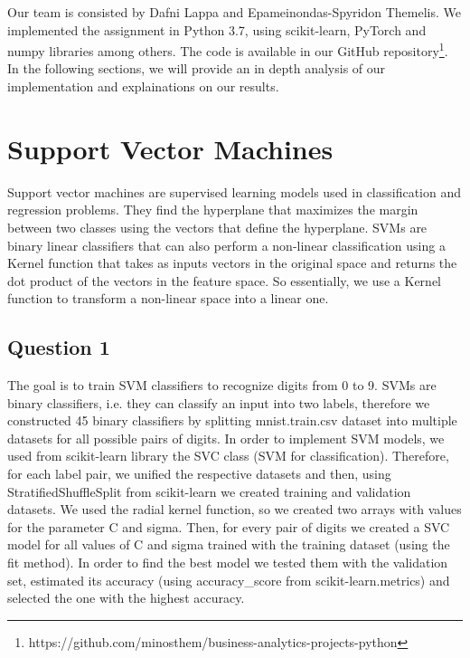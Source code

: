 \documentclass[12pt]{article}
\begin{document}
	Our team is consisted by Dafni Lappa and Epameinondas-Spyridon Themelis. We implemented the assignment in Python 3.7, using scikit-learn, PyTorch and numpy libraries among others. The code is available in our GitHub repository\footnote{https://github.com/minosthem/business-analytics-projects-python}. In the following sections, we will provide an in depth analysis of our implementation and explainations on our results.
	
	\section{Support Vector Machines}
	
	Support vector machines are supervised learning models used in classification and regression problems. They find the hyperplane that maximizes the margin between two classes using the vectors that define the hyperplane. SVMs are binary linear classifiers that can also perform a non-linear classification using a Kernel function that takes as inputs vectors in the original space and returns the dot product of the vectors in the feature space. So essentially, we use a Kernel function to transform a non-linear space into a linear one.
	
	\subsection{Question 1}
	
	The goal is to train SVM classifiers to recognize digits from 0 to 9. SVMs are binary classifiers, i.e. they can classify an input into two labels, therefore we constructed 45 binary classifiers by splitting mnist.train.csv dataset into multiple datasets for all possible pairs of digits. In order to implement SVM models, we used from scikit-learn library the SVC class (SVM for classification). Therefore, for each label pair, we unified the respective datasets and then, using StratifiedShuffleSplit from scikit-learn we created training and validation datasets. We used the radial kernel function, so we created two arrays with values for the parameter C and sigma. Then, for every pair of digits we created a SVC model for all values of C and sigma trained with the training dataset (using the fit method). In order to find the best model we tested them with the validation set, estimated its accuracy (using accuracy\_score from scikit-learn.metrics) and selected the one with the highest accuracy. 
	
\end{document}
